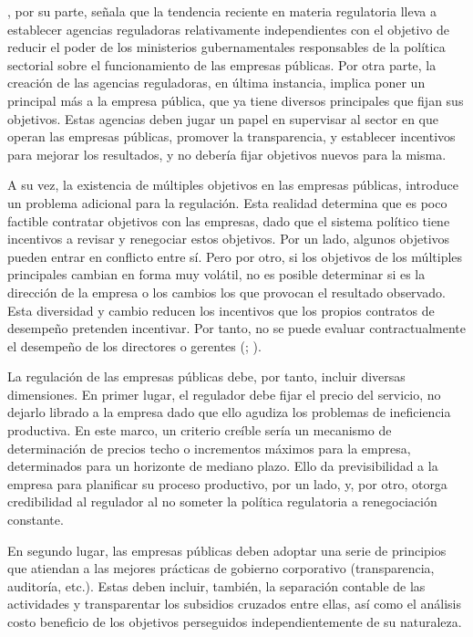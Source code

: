 \documentclass[
  12pt,
  spanish,
]{book}
\begin{document}
\citet{Berg2013}, por su parte, señala que la tendencia reciente en materia regulatoria lleva a establecer agencias reguladoras relativamente independientes con el objetivo de reducir el poder de los ministerios gubernamentales responsables de la política sectorial sobre el funcionamiento de las empresas públicas. Por otra parte, la creación de las agencias reguladoras, en última instancia, implica poner un principal más a la empresa pública, que ya tiene diversos principales que fijan sus objetivos. Estas agencias deben jugar un papel en supervisar al sector en que operan las empresas públicas, promover la transparencia, y establecer incentivos para mejorar los resultados, y no debería fijar objetivos nuevos para la misma.

A su vez, la existencia de múltiples objetivos en las empresas públicas, introduce un problema adicional para la regulación. Esta realidad determina que es poco factible contratar objetivos con las empresas, dado que el sistema político tiene incentivos a revisar y renegociar estos objetivos. Por un lado, algunos objetivos pueden entrar en conflicto entre sí. Pero por otro, si los objetivos de los múltiples principales cambian en forma muy volátil, no es posible determinar si es la dirección de la empresa o los cambios los que provocan el resultado observado. Esta diversidad y cambio reducen los incentivos que los propios contratos de desempeño pretenden incentivar. Por tanto, no se puede evaluar contractualmente el desempeño de los directores o gerentes (\citet{Martimort1996}; \citet{Dixit1997}).

La regulación de las empresas públicas debe, por tanto, incluir diversas dimensiones. En primer lugar, el regulador debe fijar el precio del servicio, no dejarlo librado a la empresa dado que ello agudiza los problemas de ineficiencia productiva. En este marco, un criterio creíble sería un mecanismo de determinación de precios techo o incrementos máximos para la empresa, determinados para un horizonte de mediano plazo. Ello da previsibilidad a la empresa para planificar su proceso productivo, por un lado, y, por otro, otorga credibilidad al regulador al no someter la política regulatoria a renegociación constante.

En segundo lugar, las empresas públicas deben adoptar una serie de principios que atiendan a las mejores prácticas de gobierno corporativo (transparencia, auditoría, etc.). Estas deben incluir, también, la separación contable de las actividades y transparentar los subsidios cruzados entre ellas, así como el análisis costo beneficio de los objetivos perseguidos independientemente de su naturaleza.
\end{document}
